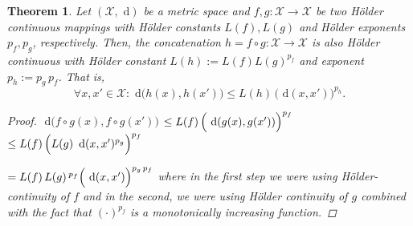 \documentclass{article} %
\newtheorem{thm}{Theorem}[section]
\newtheorem{cor}[thm]{Corollary}
\theoremstyle{definition}
\theoremstyle{remark}
\newcommand{\vc}[1]{#1}
\renewcommand{\d}[1]{\text{ d}#1}
\newcommand{\state}{\ensuremath{ \vc x}} %
\newcommand{\statespace}{\ensuremath{ \mathcal X}}
\newcommand{\metric}{\, \mathfrak{d}} %
\renewcommand{\d}{\ensuremath{\text{ d}}}
\begin{document}
%
%


\begin{thm} \label{thm:hoelderconcat}
Let $(\statespace, \d)$ be a metric space and $f,g : \statespace \to \statespace$ be two H\"older continuous mappings with H\"older constants $L(f), L(g)$ and H\"older exponents $p_f,p_g$, respectively.
Then, the concatenation $h=f \circ g: \statespace \to \statespace $ is also H\"older continuous with H\"older constant $L(h):= L(f) L(g)^{p_f}$ and exponent $p_h:=p_g \, p_f$.
That is, 
\[\forall \state,\state' \in \statespace: \d\bigl(h(\state),h(\state')\bigr) \leq L(h) \, \bigl(\d(\state,\state')\bigr)^{p_h}.\]
\begin{proof}
$\d\bigl(f \circ g(\state),f\circ g(\state')\bigr)$ $\leq L(f)\,  \Bigl(\d(g(\state),g(\state'))\Bigr)^{p_f}$
$\leq L(f)\,  \Bigl(L(g)\, \d(\state,\state')^{p_g}\Bigr)^{p_f}$ 

$= L(f)\, L(g)\,^{p_f}   \Bigl(\d(\state,\state')\Bigr)^{p_g\, p_f} $ where in the first step we were using H\"older-continuity of $f$ and in the second, we were using H\"older continuity of $g$ combined with the fact that $(\cdot)^{p_f}$ is a monotonically increasing  function. 
\end{proof}
\end{thm} 
\end{document}
